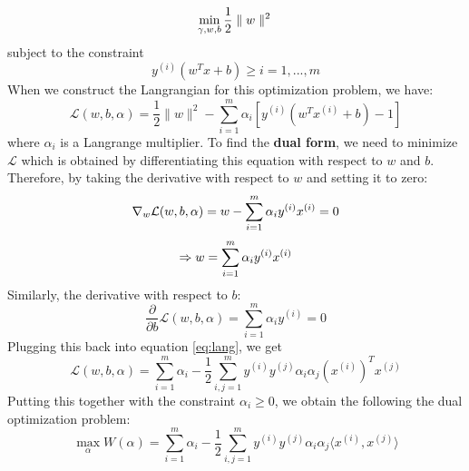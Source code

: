 \documentclass[%
        final,
        internal,
        notitlepage,
        narroweqnarray,
        inline,
        ]{ieee}
\begin{document}
\begin{equation}
\min_{\gamma, w, b} \frac{1}{2}\parallel w \parallel ^2\\
\end{equation}
subject to the constraint
\begin{equation}
y^{(i)}(w^Tx + b) \geq i = 1, ..., m
\end{equation}
When we construct the Langrangian for this optimization problem, we have:
\begin{equation} \label{eq:lang}
\mathcal {L}(w, b, \alpha) = \frac{1}{2} \parallel w \parallel ^2 - \sum_{i=1}^{m} \alpha_i [y^{(i)}(w^Tx^{(i)} + b) - 1]
\end{equation}
where $\alpha_{i}$ is a Langrange multiplier. To find the \textbf{dual form}, we need to minimize $\mathcal{L}$ which is obtained by differentiating this equation with respect to $w$ and $b$.
Therefore, by taking the derivative with respect to $w$ and setting it to zero:
\begin{equation}
\nabla_{w} \mathcal{L}(w,b,\alpha) = w - \sum_{i=1}^{m} \alpha_{i} y^{(i)} x^{(i)} = 0\\
\end{equation}
\begin{equation} \label{eq:w}
\Rightarrow w = \sum_{i=1}^{m} \alpha_{i} y^{(i)} x^{(i)}\\
\end{equation}
Similarly, the derivative with respect to $b$:
\begin{equation} \label{eq:ay}
\dfrac{\partial}{\partial b} \mathcal{L}(w,b,\alpha) = \sum_{i=1}^{m} \alpha_{i} y^{(i)} = 0
\end{equation}
Plugging this back into equation \ref{eq:lang}, we get
\begin{equation}
\mathcal {L}(w, b, \alpha) = \sum_{i=1}^{m} \alpha_i - \frac{1}{2} \sum_{i,j=1}^{m} y^{(i)}y^{(j)}\alpha_i \alpha_j (x^{(i)})^T x^{(j)}
\end{equation}
Putting this together with the constraint $\alpha_i \geq 0$, we obtain the following the dual optimization problem:
\begin{equation} \label{eq:dual}
\max_{\alpha} W(\alpha) = \sum_{i=1}^{m} \alpha_i - \frac{1}{2} \sum_{i,j=1}^{m} y^{(i)}y^{(j)}\alpha_i \alpha_j \langle x^{(i)}, x^{(j)}\rangle
\end{equation}
\end{document}

